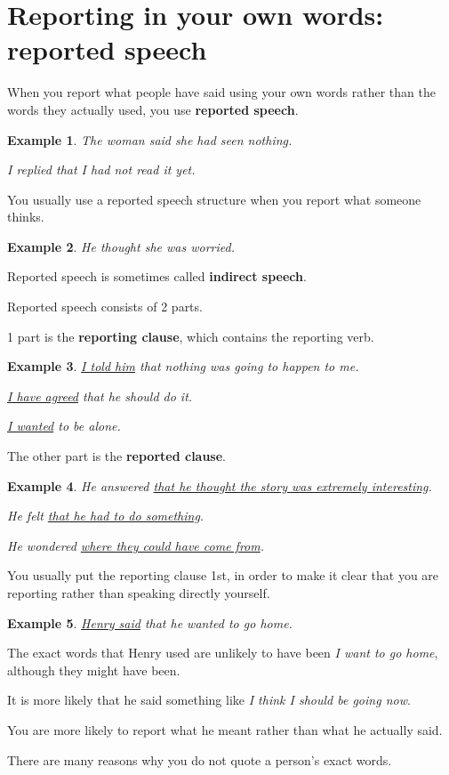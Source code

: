 \documentclass[oneside]{book}
\numberwithin{equation}{section}
\newtheorem{example}{Example}[section]
\begin{document}
\section{Reporting in your own words: reported speech}
\noindent{} When you report what people have said using your own words rather than the words they actually used, you use \textbf{reported speech}.
\begin{example}
    The woman said she had seen nothing.
    
    I replied that I had not read it yet.
\end{example}
You usually use a reported speech structure when you report what someone thinks.
\begin{example}
    He thought she was worried.
\end{example}
Reported speech is sometimes called \textbf{indirect speech}.

Reported speech consists of 2 parts.

1 part is the \textbf{reporting clause}, which contains the reporting verb.
\begin{example}
    \underline{I told him} that nothing was going to happen to me.
    
    \underline{I have agreed} that he should do it.
    
    \underline{I wanted} to be alone.
\end{example}
The other part is the \textbf{reported clause}.
\begin{example}
    He answered \underline{that he thought the story was extremely interesting}.
    
    He felt \underline{that he had to do something}.
    
    He wondered \underline{where they could have come from}.
\end{example}
You usually put the reporting clause 1st, in order to make it clear that you are reporting rather than speaking directly yourself.
\begin{example}
    \underline{Henry said} that he wanted to go home.
\end{example}
The exact words that Henry used are unlikely to have been \textit{I want to go home}, although they might have been.

It is more likely that he said something like \textit{I think I should be going now}.

You are more likely to report what he meant rather than what he actually said.

%
There are many reasons why you do not quote a person's exact words.
\end{document}
